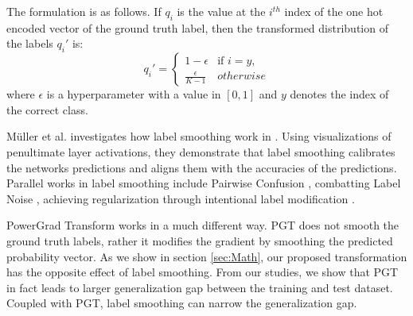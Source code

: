 \documentclass[times,sort&compress]{elsarticle}
\begin{document}
The formulation is as follows. If $q_i$ is the value at the $i^{th}$ index of the one
hot encoded vector of the ground truth label, then the transformed distribution of the
labels $q_i'$ is: \begin{equation} q_i' = \begin{cases} 1-\epsilon & \text{if } i = y,
\\ \frac{\epsilon}{K-1} & otherwise \end{cases} \end{equation} where $\epsilon$ is a
hyperparameter with a value in $[0,1]$ and $y$ denotes the index of the correct class.



Müller et al. investigates how label smoothing work in \cite{DBLP:conf/nips/MullerKH19}.
Using visualizations of penultimate layer activations, they demonstrate that label
smoothing calibrates the networks predictions and aligns them with the accuracies of the
predictions. Parallel works in label smoothing include Pairwise Confusion
\cite{dubey2018pairwise}, combatting Label Noise \cite{reed2014training}, achieving
regularization through intentional label modification \cite{xie2016disturblabel}.

PowerGrad Transform works in a much different way. PGT does not smooth the ground truth
labels, rather it modifies the gradient by smoothing the predicted probability vector.
As we show in section \ref{sec:Math}, our proposed transformation has the opposite
effect of label smoothing. From our studies, we show that PGT in fact leads to larger
generalization gap between the training and test dataset. Coupled with PGT, label
smoothing can narrow the generalization gap.
\end{document}

